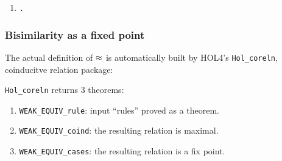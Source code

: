 \begin{frame}[fragile]
\begin{definition}
\begin{small}
\begin{enumerate}
\begin{scriptsize}
\begin{alltt}
    (\HOLSymConst{\HOLTokenForall{}}.  \HOLTokenTransBegin\HOLSymConst{\ensuremath{\tau}}\HOLTokenTransEnd {} \HOLSymConst{\HOLTokenImp{}} \HOLSymConst{\HOLTokenExists{}}.  \HOLSymConst{\HOLTokenEPS}  \HOLSymConst{\HOLTokenConj{}}   ) \HOLSymConst{\HOLTokenConj{}}
    \HOLSymConst{\HOLTokenForall{}}.  \HOLTokenTransBegin\HOLSymConst{\ensuremath{\tau}}\HOLTokenTransEnd {} \HOLSymConst{\HOLTokenImp{}} \HOLSymConst{\HOLTokenExists{}}.  \HOLSymConst{\HOLTokenEPS}  \HOLSymConst{\HOLTokenConj{}}   
\end{alltt}\end{scriptsize}
\item \begin{alltt}
 \HOLSymConst{\HOLTokenWeakEQ}  \HOLSymConst{\HOLTokenEquiv{}} \HOLSymConst{\HOLTokenExists{}}.    \HOLSymConst{\HOLTokenConj{}}  
\end{alltt}
\end{enumerate}
\end{small}
\end{definition}
\end{frame}

\begin{frame}
\frametitle{Bisimilarity as a fixed point}
\vspace{-2ex}
The actual definition of $\approx$ is automatically built by HOL4's
\texttt{Hol_coreln}, coinducitve relation package:

\texttt{Hol_coreln} returns 3 theorems:
\begin{enumerate}
\item \texttt{WEAK_EQUIV_rule}: input ``rules'' proved as a theorem.
\item \texttt{WEAK_EQUIV_coind}: the resulting relation is maximal.
\item \texttt{WEAK_EQUIV_cases}: the resulting relation is a fix point.
\end{enumerate}
\end{frame}

